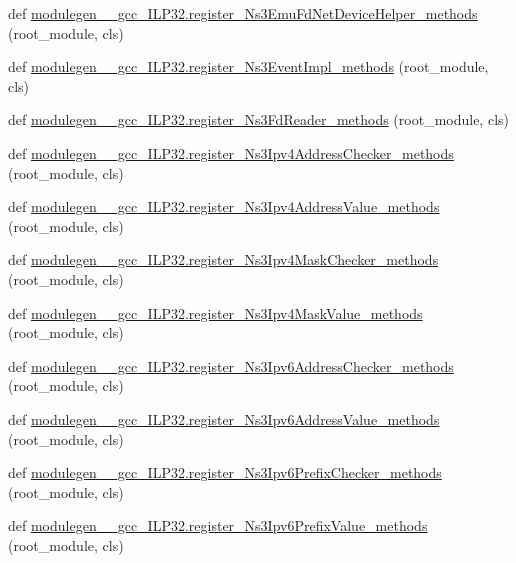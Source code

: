 \begin{DoxyCompactItemize}
\item 
def \hyperlink{namespacemodulegen____gcc__ILP32_abdfe98c99d2a8eb62898be64bba2ff5e}{modulegen\+\_\+\+\_\+gcc\+\_\+\+I\+L\+P32.\+register\+\_\+\+Ns3\+Emu\+Fd\+Net\+Device\+Helper\+\_\+methods} (root\+\_\+module, cls)
\item 
def \hyperlink{namespacemodulegen____gcc__ILP32_a600366111aadb7115136bfec5f8675e7}{modulegen\+\_\+\+\_\+gcc\+\_\+\+I\+L\+P32.\+register\+\_\+\+Ns3\+Event\+Impl\+\_\+methods} (root\+\_\+module, cls)
\item 
def \hyperlink{namespacemodulegen____gcc__ILP32_af48d9bb05f1ce7739a7b11df3118db68}{modulegen\+\_\+\+\_\+gcc\+\_\+\+I\+L\+P32.\+register\+\_\+\+Ns3\+Fd\+Reader\+\_\+methods} (root\+\_\+module, cls)
\item 
def \hyperlink{namespacemodulegen____gcc__ILP32_a91bc88170d5111bf6c9c0defc82f9018}{modulegen\+\_\+\+\_\+gcc\+\_\+\+I\+L\+P32.\+register\+\_\+\+Ns3\+Ipv4\+Address\+Checker\+\_\+methods} (root\+\_\+module, cls)
\item 
def \hyperlink{namespacemodulegen____gcc__ILP32_a9b966337400674f232afe6830aa55a11}{modulegen\+\_\+\+\_\+gcc\+\_\+\+I\+L\+P32.\+register\+\_\+\+Ns3\+Ipv4\+Address\+Value\+\_\+methods} (root\+\_\+module, cls)
\item 
def \hyperlink{namespacemodulegen____gcc__ILP32_a0c8c90b61f4e832ecf41510f18e20e98}{modulegen\+\_\+\+\_\+gcc\+\_\+\+I\+L\+P32.\+register\+\_\+\+Ns3\+Ipv4\+Mask\+Checker\+\_\+methods} (root\+\_\+module, cls)
\item 
def \hyperlink{namespacemodulegen____gcc__ILP32_aa0677871460e65b32fe90ab9bef43b9f}{modulegen\+\_\+\+\_\+gcc\+\_\+\+I\+L\+P32.\+register\+\_\+\+Ns3\+Ipv4\+Mask\+Value\+\_\+methods} (root\+\_\+module, cls)
\item 
def \hyperlink{namespacemodulegen____gcc__ILP32_aed7bbb9a518f22e7091964769eb4c4d3}{modulegen\+\_\+\+\_\+gcc\+\_\+\+I\+L\+P32.\+register\+\_\+\+Ns3\+Ipv6\+Address\+Checker\+\_\+methods} (root\+\_\+module, cls)
\item 
def \hyperlink{namespacemodulegen____gcc__ILP32_a94efe88582382700df8f33c69780357b}{modulegen\+\_\+\+\_\+gcc\+\_\+\+I\+L\+P32.\+register\+\_\+\+Ns3\+Ipv6\+Address\+Value\+\_\+methods} (root\+\_\+module, cls)
\item 
def \hyperlink{namespacemodulegen____gcc__ILP32_a98ee840f5ce1609ca10ebe6eb1022047}{modulegen\+\_\+\+\_\+gcc\+\_\+\+I\+L\+P32.\+register\+\_\+\+Ns3\+Ipv6\+Prefix\+Checker\+\_\+methods} (root\+\_\+module, cls)
\item 
def \hyperlink{namespacemodulegen____gcc__ILP32_a0b720f36ae3a4e1b9a79eba05de63e4a}{modulegen\+\_\+\+\_\+gcc\+\_\+\+I\+L\+P32.\+register\+\_\+\+Ns3\+Ipv6\+Prefix\+Value\+\_\+methods} (root\+\_\+module, cls)

\end{DoxyCompactItemize}
